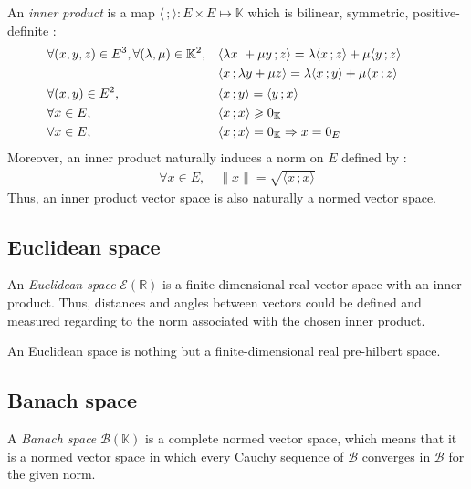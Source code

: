 An \emph{inner product} is a map $\langle \,; \rangle : E \times E \longmapsto \mathbb{K}$ which is bilinear, symmetric, positive-definite :
\begin{subequations}
\begin{align}
	&\forall (x,y,z) \in E^3, \forall (\lambda,\mu) \in \mathbb{K}^2, 	&& \langle \lambda x\ + \mu y \,; z\rangle  = \lambda \langle  x \,; z\rangle + \mu \langle  y\,; z\rangle&&&\\
	&												&& \langle x \,; \lambda y + \mu z \rangle  = \lambda \langle  x\,; y\rangle + \mu \langle  x \,; z\rangle&&&\notag\\
	&\forall (x,y) \in E^2, 									&& \langle x\,; y\rangle = \langle y\,; x\rangle &&&\\
	&\forall x \in E, 										&& \langle x\,; x\rangle \geqslant 0_\mathbb{K} &&&\\
	&\forall x \in E, 										&& \langle x\,; x\rangle = 0_\mathbb{K} \Rightarrow x = 0_E &&&
\end{align}
\end{subequations}
Moreover, an inner product naturally induces a norm on $E$ defined by :
\begin{align}
	\forall x \in E, \quad \|x\| = \sqrt{\langle x\,; x\rangle}
\end{align}
Thus, an inner product vector space is also naturally a normed vector space.

\subsection{Euclidean space}
An \emph{Euclidean space} $\mathcal{E}(\mathbb{R})$ is a finite-dimensional real vector space with an inner product.
Thus, distances and angles between vectors could be defined and measured regarding to the norm associated with the chosen inner product.

An Euclidean space is nothing but a finite-dimensional real pre-hilbert space.

\subsection{Banach space}

A \emph{Banach space} $\mathcal{B}(\mathbb{K})$ is a complete normed vector space, which means that it is a normed vector space in which every Cauchy sequence of $\mathcal{B}$ converges in $\mathcal{B}$ for the given norm.

